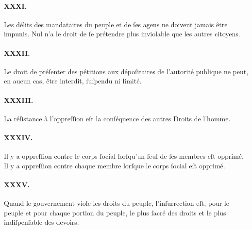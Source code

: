 \documentclass[10pt]{article}
\begin{document}
\paragraph*{XXXI.}Les délits des mandataires du peuple et de ſes agens ne doivent jamais être impunis. Nul n'a le droit de ſe prétendre plus inviolable que les autres citoyens.
\paragraph*{XXXII.}Le droit de préſenter des pétitions aux dépoſitaires de l'autorité publique ne peut, en aucun cas, être interdit, ſuſpendu ni limité.
\paragraph*{XXXIII.}La réſistance à l'oppreſſion eſt la conſéquence des autres Droits de l'homme.
\paragraph*{XXXIV.}Il y a oppreſſion contre le corps ſocial lorſqu'un ſeul de ſes membres eſt opprimé. Il y a oppreſſion contre chaque membre lorſque le corps ſocial eſt opprimé.
\paragraph*{XXXV.}Quand le gouvernement viole les droits du peuple, l'inſurrection eſt, pour le peuple et pour chaque portion du peuple, le plus ſacré des droits et le plus indiſpenſable des devoirs.

\pagebreak
\end{document}
